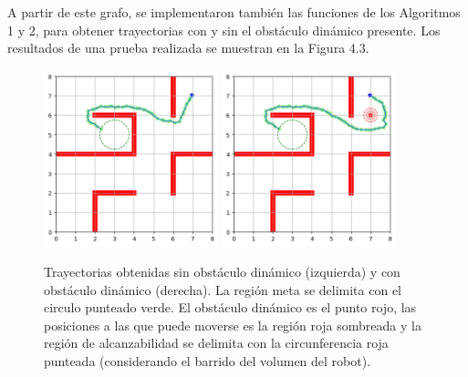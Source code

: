 \documentclass[spanish,mexico]{article}
\numberwithin{equation}{section}
\theoremstyle{definition}
\theoremstyle{remark}
\begin{document}
A partir de este grafo, se implementaron también las funciones de los Algoritmos 1 y 2, para obtener trayectorias con y sin el obstáculo dinámico presente. Los resultados de una prueba realizada se muestran en la Figura 4.3.
\begin{figure}[!h]
  \centering
	{\includegraphics[width=0.45\textwidth]{img/path2.png}\label{fig:f1}}
  \hfill
  	{\includegraphics[width=0.45\textwidth]{img/pathObst.png}\label{fig:f2}}
  \caption{Trayectorias obtenidas sin obstáculo dinámico (izquierda) y con obstáculo dinámico (derecha). La región meta se delimita con el circulo punteado verde. El obstáculo dinámico es el punto rojo, las posiciones a las que puede moverse es la región roja sombreada y la región de alcanzabilidad se delimita con la circunferencia roja punteada (considerando el barrido del volumen del robot).}
\end{figure}
\end{document}

